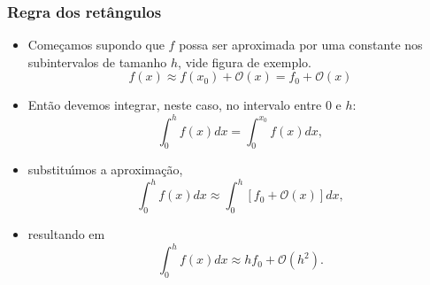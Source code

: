 \documentclass[xcolor=table]{beamer}
\newenvironment{stepitemize}{\begin{itemize}[<+->]}{\end{itemize} }
\begin{document}
\begin{frame}%

\frametitle{Regra dos ret\^{a}ngulos}

\begin{stepitemize}
\item Come\c{c}amos supondo que $f$ possa ser aproximada por uma constante
nos subintervalos de tamanho $h$, vide figura de exemplo.%
\[
f\left( x\right) \approx f\left( x_{0}\right) +\mathcal{O}\left( x\right)
=f_{0}+\mathcal{O}\left( x\right) 
\]

\item Ent\~{a}o devemos integrar, neste caso, no intervalo entre $0$ e $h$:%
\[
\int_{0}^{h}f\left( x\right) dx=\int_{0}^{x_{0}}f\left( x\right) dx ,
\]

\item substitu\'{\i}mos a aproxima\c{c}\~{a}o,%
\[
\int_{0}^{h}f\left( x\right) dx\approx \int_{0}^{h}\left[ f_{0}+\mathcal{O}\left(
x\right) \right] dx ,
\]

\item resultando em%
\begin{equation}
\int_{0}^{h}f\left( x\right) dx\approx hf_{0}+\mathcal{O}\left( h^{2}\right) .
\label{eq.retangulo}
\end{equation}
\end{stepitemize}

\transboxout%
\end{frame}%
\end{document}
